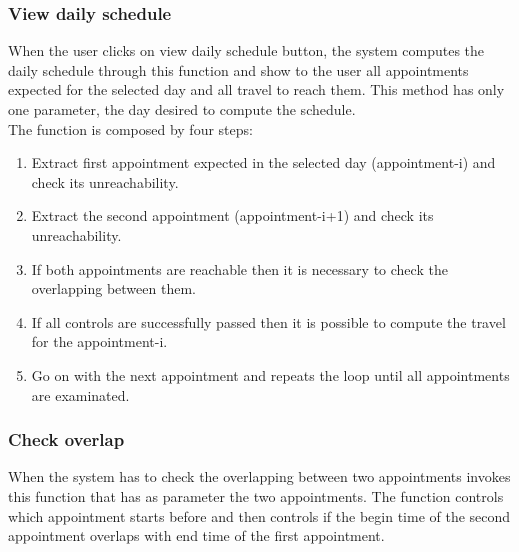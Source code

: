\subsubsection{View daily schedule}
\label{subsec:algSchedule}
When the user clicks on view daily schedule button, the system computes the daily schedule through this function and show to the user all appointments expected for the selected day and all travel to reach them.
This method has only one parameter, the day desired to compute the schedule.\\
The function is composed by four steps:
\begin{enumerate}
	\item Extract first appointment expected in the selected day (appointment-i) and check its unreachability.
	\item Extract the second appointment (appointment-i+1) and check its unreachability.
	\item If both appointments are reachable then it is necessary to check the overlapping between them.
	\item If all controls are successfully passed then it is possible to compute the travel for the appointment-i.
	\item Go on with the next appointment and repeats the loop until all appointments are examinated.
\end{enumerate}

\begin{algorithmic}
		
				\State {}
			\EndIf
		\EndFor
		
			\State {}
			\State {}
		\EndIf
	\EndFunction
\end{algorithmic}

\subsubsection{Check overlap}
\label{subsec:algOverlap}
When the system has to check the overlapping between two appointments invokes this function that has as parameter the two appointments.
The function controls which appointment starts before and then controls if the begin time of the second appointment overlaps with end time of the first appointment.

